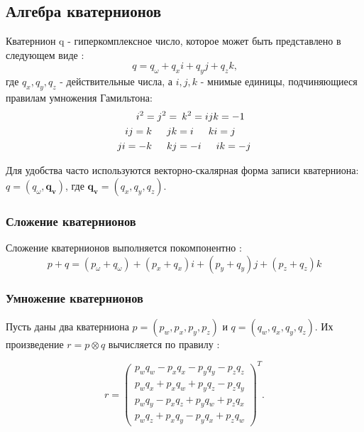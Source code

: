 
\subsection{Алгебра кватернионов}

Кватернион q - гиперкомплексное число, которое может быть представлено в следующем виде \cite{hypercomplex_number, salamin1974quaternions}:
\begin{equation*}
	q = q_{\omega} + q_x i + q_y j + q_z k \text{,}
\end{equation*}
где $q_x, q_y, q_z$ - действительные числа, а $i, j, k$ - мнимые единицы, подчиняющиеся правилам умножения Гамильтона:
\begin{align*}
	i^2 = j^2 =& \hspace*{5pt} k^2 = ijk = -1 \\
	ij = k  \hspace*{15pt} jk &= i  \hspace*{15pt} ki = j 	\\
	ji = -k \hspace*{15pt} kj &= -i \hspace*{15pt} ik = -j
\end{align*}

Для удобства часто используются векторно-скалярная форма записи кватерниона: $q = (q_{\omega}, \bm{q_v})$, где $\bm{q_v} = (q_x, q_y, q_z)$.


\subsubsection{Сложение кватернионов}
Сложение кватернионов выполняется покомпонентно \cite{hypercomplex_number}:
\begin{equation*}
	p + q = (p_{\omega} + q_{\omega}) + (p_x + q_x) i + (p_y + q_y) j + (p_z + q_z) k
\end{equation*}


\subsubsection{Умножение кватернионов}
Пусть даны два кватерниона $p = (p_w, p_x, p_y, p_z)$ и $q = (q_w, q_x, q_y, q_z)$. Их произведение $r = p \otimes q$ вычисляется по правилу \cite{hypercomplex_number}:

\begin{equation}
\label{eq:q_mult}
	r = \begin{pmatrix} 
		p_w q_w - p_x q_x - p_y q_y - p_z q_z \\
		p_w q_x + p_x q_w + p_y q_z - p_z q_y \\
		p_w q_y - p_x q_z + p_y q_w + p_z q_x \\
		p_w q_z + p_x q_y - p_y q_x + p_z q_w 
	\end{pmatrix}^T . \tag{4.2}
\end{equation}

